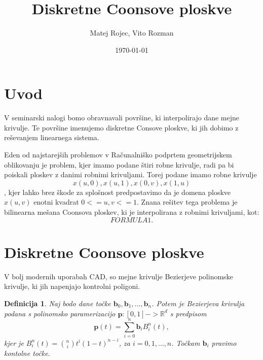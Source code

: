 \documentclass[a4paper,12pt]{article}
\begin{document}
\newcommand{\N}{\mathbb{N}}
\newcommand{\R}{\mathbb{R}}
\newcommand\sbullet[1][.5]{\mathbin{\vcenter{\hbox{\scalebox{#1}{$\bullet$}}}}}
\newtheorem{definicija}{Definicija}[section]
\newtheorem{primer}[definicija]{Primer}
\newtheorem{opomba}[definicija]{Opomba}


\title{Diskretne Coonsove ploskve}
\author{Matej Rojec, Vito Rozman}
\date{\today}

\maketitle


\newpage

\tableofcontents
\listoffigures

\newpage

\section{Uvod}

V seminarski nalogi bomo obravnavali površine, ki interpolirajo dane mejne krivulje. 
Te površine imenujemo diskretne Consove ploskve, ki jih dobimo z reševanjem linearnega sistema.


Eden od najstarejših problemov v Računalniško podprtem geometrijskem oblikovanju je problem, 
kjer imamo podane štiri robne krivulje, radi pa bi poiskali ploskev z danimi robnimi krivuljami. 
Torej podane imamo robne krivulje $$x(u,0), x(u,1), x(0,v),  x(1,u)$$, kjer lahko brez škode za 
splošnost predpostavimo da je domena ploskve $x(u,v)$ enotni kvadrat $0 <= u,v <=1$. Znana rešitev 
tega problema je bilinearna mešana Coonsova ploskev, ki je interpolirana z robnimi 
krivuljami, kot: 
$$ FORMULA 1.$$ 

\section{Diskretne Coonsove ploskve}
V bolj modernih uporabah CAD, so mejne krivulje Bezierjeve polinomske krivulje, 
ki jih napenjajo kontrolni poligoni. 
\begin{definicija}
    Naj bodo dane točke $\mathbf{b}_0, \mathbf{b}_1, \dots, \mathbf{b}_n$. Potem je Bezierjeva 
    krivulja podana s polinomsko paramerizacijo $\mathbf{p}: [0,1] -> \R^d$ s predpisom 
    $$\mathbf{p}(t) = \sum_{i=0}^n \mathbf{b}_{i} B_i^n(t),$$
    kjer je $B_i^n(t) = \binom{n}{i} t^i (1-t)^{n-i}$, za $i = 0, 1,\dots,n$. Točkam $\mathbf{b}_i$
    pravimo kontolne točke.
\end{definicija}
\end{document}
